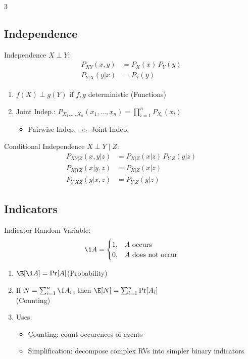 \documentclass[12pt, a4paper]{article}
\begin{document}
\begin{multicols*}{3}
\subsection{Independence}
Independence $X \perp Y$:
\begin{align*}
  P_{XY}(x,y) &= P_X(x)\,P_Y(y)\\
  P_{Y|X}(y|x) &= P_Y(y)
\end{align*}
\begin{enumerate}[\roman*.]
  \item $f(X)\perp g(Y)$ if $f,g$ deterministic \hfill(Functions)
  \item Joint Indep.: $P_{X_1,\ldots,X_n}(x_1,\ldots,x_n)=\prod_{i=1}^n P_{X_i}(x_i)$
    \begin{itemize}[leftmargin=*]\vspace{3pt }
      \item Pairwise Indep. $\nRightarrow$ Joint Indep.
    \end{itemize}
\end{enumerate}

Conditional Independence $X \perp Y \mid Z$:
\begin{align*}
  P_{XY|Z}(x,y|z) &= P_{X|Z}(x|z)\,P_{Y|Z}(y|z)\\
  P_{X|YZ}(x|y,z) &= P_{X|Z}(x|z)\\
  P_{Y|XZ}(y|x,z) &= P_{Y|Z}(y|z)
\end{align*}

\subsection{Indicators}
Indicator Random Variable:
\begin{align*}
  \1{A} = 
  \begin{cases}
    1,& A \text{ occurs}\\
    0,& A \text{ does not occur}
  \end{cases}
\end{align*}
\begin{enumerate}[\roman*.]
  \item $\E[\1{A}] = \Pr[A]$\hfill(Probability)
  \item If $N=\sum_{i=1}^n \1{A_i}$, then $\E[N]=\sum_{i=1}^n \Pr[A_i]$\\\hfill(Counting)
  \item Uses:
    \begin{itemize}[leftmargin=*]\vspace{3pt}
      \item Counting: count occurences of events
      \item Simplification: decompose complex RVs into simpler binary indicators
    \end{itemize}
\end{enumerate}


\end{multicols*}
\end{document}
